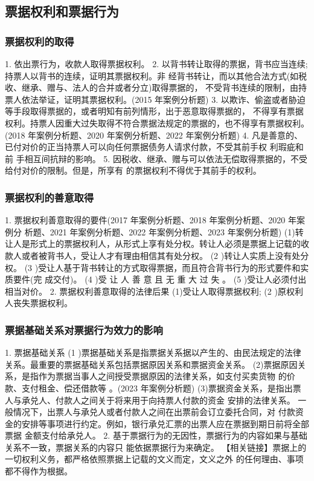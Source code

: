 \documentclass[UTF8,12pt]{ctexart}
\numberwithin{equation}{section} %
\numberwithin{figure}{section}
\numberwithin{table}{section}
\begin{document}
	\subsection{票据权利和票据行为}
	
	\subsubsection{票据权利的取得}
	1. 依出票行为，收款人取得票据权利。
	2. 以背书转让取得的票据，背书应当连续;持票人以背书的连续，证明其票据权利。非 经背书转让，而以其他合法方式(如税收、继承、赠与、法人的合并或者分立)取得票据的， 不受背书连续的限制，由持票人依法举证，证明其票据权利。(2015 年案例分析题)
	3. 以欺诈、偷盗或者胁迫等手段取得票据的，或者明知有前列情形，出于恶意取得票据的， 不得享有票据权利。持票人因重大过失取得不符合票据法规定的票据的，也不得享有票据权利。 (2018 年案例分析题、2020 年案例分析题、2022 年案例分析题)
	4. 凡是善意的、已付对价的正当持票人可以向任何票据债务人请求付款，不受其前手权 利瑕疵和前 手相互间抗辩的影响。
	5. 因税收、继承、赠与可以依法无偿取得票据的，不受给付对价的限制。但是，所享有 的票据权利不得优于其前手的权利。
	 
	\subsubsection{票据权利的善意取得} 
	1. 票据权利善意取得的要件(2017 年案例分析题、2018 年案例分析题、2020 年案例分 析题、2021 年案例分析题、2022 年案例分析题、2023 年案例分析题) (1)转让人是形式上的票据权利人，从形式上享有处分权。转让人必须是票据上记载的收 款人或者被背书人，受让人才有理由相信其有处分权。
	(2 )转让人实质上没有处分权。
	(3 )受让人基于背书转让的方式取得票据，而且符合背书行为的形式要件和实质要件(完 成交付)。
	(4 )受 让 人 善 意 且 无 重 大 过 失 。
	(5 )受让人必须付出相当对价。
	2. 票据权利善意取得的法律后果
	(1)受让人取得票据权利;
	(2 )原权利人丧失票据权利。
	
	\subsubsection{票据基础关系对票据行为效力的影响} 
	1. 票据基础关系
	(1 )票据基础关系是指票据关系据以产生的、由民法规定的法律关系。最重要的票据基础关系包括票据原因关系和票据资金关系。 (2)票据原因关系，是指作为票据当事人之间授受票据原因的法律关系，如支付买卖货物 的价款、支付租金、偿还借款等 。(2023 年案例分析题) (3)票据资金关系，是指出票人与承兑人、付款人之间关于将来用于向持票人付款的资金 安排的法律关系。 一般情况下，出票人与承兑人或者付款人之间在出票前会订立委托合同，对 付款资金的安排等事项进行约定。例如，银行承兑汇票的出票人应在票据到期日前将全部票据 金额支付给承兑人。
	2. 基于票据行为的无因性，票据行为的内容如果与基础关系不一致，票据关系的内容只 能依据票据行为来确定。
	【相关链接】票据上的 一切权利义务，都严格依照票据上记载的文义而定，文义之外 的任何理由、事项都不得作为根据。
	
\end{document}
